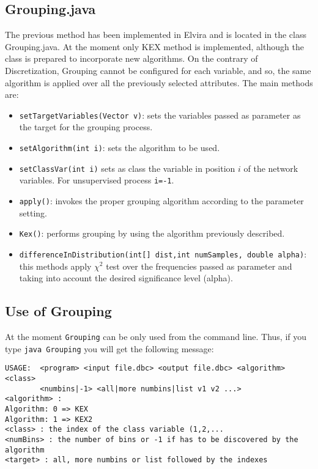 \subsection{Grouping.java}

The previous method has been implemented in Elvira and is located in 
the class Grouping.java. At the moment only KEX method is implemented,
although the class is prepared to incorporate new algorithms. On the 
contrary of {\sf Discretization}, {\sf Grouping} cannot be configured for
each variable, and so, the same algorithm is applied over all the previously
selected attributes. The main methods are:
\begin{itemize}
\item {\tt setTargetVariables(Vector v)}: sets the variables passed as
parameter as the target for the grouping process.
\item {\tt setAlgorithm(int i)}: sets the algorithm to be used.
\item {\tt setClassVar(int i)} sets as class the variable in position $i$
of the network variables. For unsupervised process {\tt i=-1}.
\item {\tt apply()}: invokes the proper grouping algorithm according to the
parameter setting.
\item {\tt Kex()}: performs grouping by using the algorithm previously described.
\item {\tt differenceInDistribution(int[] dist,int numSamples, double alpha)}: this 
methods apply $\chi^2$ test over the frequencies passed as parameter and taking into
account the desired significance level (alpha).
\end{itemize}

\subsection{Use of Grouping}

At the moment {\tt Grouping} can be only used from the command line. Thus,
if you type {\tt java Grouping} you will get the following message:

\begin{verbatim}
USAGE:  <program> <input file.dbc> <output file.dbc> <algorithm> <class>
        <numbins|-1> <all|more numbins|list v1 v2 ...>
<algorithm> :
Algorithm: 0 => KEX
Algorithm: 1 => KEX2
<class> : the index of the class variable (1,2,...
<numBins> : the number of bins or -1 if has to be discovered by the algorithm
<target> : all, more numbins or list followed by the indexes
\end{verbatim}

